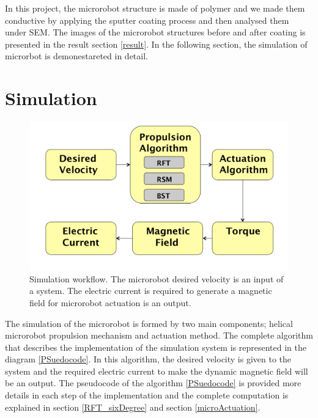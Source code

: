 \documentclass[12pt,a4paper,titlepage]{report}
\begin{document}
In this project, the microrobot structure is made of polymer and we made them conductive by applying the 
sputter coating process and then analysed them under \ac*{SEM}. The images of the microrobot structures 
before and after coating is presented in the result section \ref{result}. In the following section, the simulation of 
microrbot is demonestareted in detail.



\section{Simulation}\label{simulation}





\begin{figure}
  \centering
    \includegraphics[width=1.0\textwidth]{Simulation_Diag}
  \caption[Fabrication process overview]{Simulation workflow. The microrobot 
desired velocity is an input of a system. The electric current is required to generate a magnetic field for microrobot
actuation is an output.}
  \label{Simulation_Diag}
\end{figure}



The simulation of the microrobot is formed by two main components; helical microrobot propulsion mechanism
 and actuation method. The complete algorithm that describes the implementation of the simulation
system is represented in the diagram \ref{PSuedocode}. In this algorithm, the desired velocity is given to the system
and the required electric current to make the dynamic magnetic field will be an output. The pseudocode of
the algorithm \ref{PSuedocode} is provided more details in each step of the implementation and the complete computation
is explained in section \ref{RFT_sixDegree} and section \ref{microActuation}.  
\end{document}
